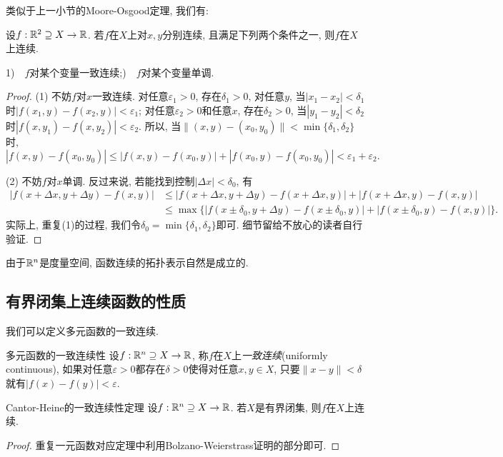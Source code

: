 类似于上一小节的Moore-Osgood定理, 我们有: 

\begin{proposition}{}
	设$f:\mathbb{R} ^2 \supseteq X \to \mathbb{R}$. 若$f$在$X$上对$x,y$分别连续, 且满足下列两个条件之一, 则$f$在$X$上连续. 
	
	1)~~$f$对某个变量一致连续;)~~$f$对某个变量单调. 
\end{proposition}
\begin{proof}
	(1) 不妨$f$对$x$一致连续. 对任意$\varepsilon _1>0$, 存在$\delta _1 >0$, 对任意$y$, 当$|x_1-x_2|<\delta _1$时$|f(x_1,y)-f(x_2,y)|<\varepsilon _1$; 对任意$\varepsilon _2>0$和任意$x$, 存在$\delta _2 >0$, 当$|y_1-y_2|<\delta _2$时$|f(x,y_1)-f(x,y_2)|<\varepsilon _2$. 所以, 当$\| (x,y)-(x_0,y_0) \|<\min \{ \delta _1,\delta _2 \}$时, $$|f(x,y)-f(x_0,y_0)| \leq |f(x,y)-f(x_0,y)| + |f(x_0,y)-f(x_0,y_0)| < \varepsilon _1 + \varepsilon _2. $$
	
	(2) 不妨$f$对$x$单调. 反过来说, 若能找到控制$|\Delta x| < \delta _0$, 有
	\begin{align*}
		|f(x+\Delta x,y+\Delta y)-f(x,y)| &\leq |f(x+\Delta x,y+\Delta y) - f(x+\Delta x,y)| + |f(x+\Delta x,y) - f(x,y)|  \\
		&\leq \max \{ |f(x \pm \delta _0 , y+\Delta y) - f(x \pm \delta _0 , y)| + |f(x \pm \delta _0 , y) - f(x,y)| \}.
	\end{align*}
	实际上, 重复(1)的过程, 我们令$\delta _0 = \min \{ \delta _1,\delta _2 \}$即可. 细节留给不放心的读者自行验证. 
\end{proof}

由于$\mathbb{R} ^n$是度量空间, 函数连续的拓扑表示自然是成立的. 

\subsection{有界闭集上连续函数的性质}

我们可以定义多元函数的一致连续. 

\begin{definition}{多元函数的一致连续性}
	设$f:\mathbb{R} ^n \supseteq X \to \mathbb{R}$, 称$f$在$X$上\textit{一致连续}(uniformly continuous), 如果对任意$\varepsilon >0$都存在$\delta >0$使得对任意$x,y \in X$, 只要$\| x-y \|<\delta$就有$|f(x)-f(y)|<\varepsilon$. 
\end{definition}

\begin{theorem}{Cantor-Heine的一致连续性定理}
	设$f:\mathbb{R} ^n \supseteq X \to \mathbb{R}$. 若$X$是有界闭集, 则$f$在$X$上连续. 
\end{theorem}
\begin{proof}
	重复一元函数对应定理中利用Bolzano-Weierstrass证明的部分即可. 
\end{proof}

